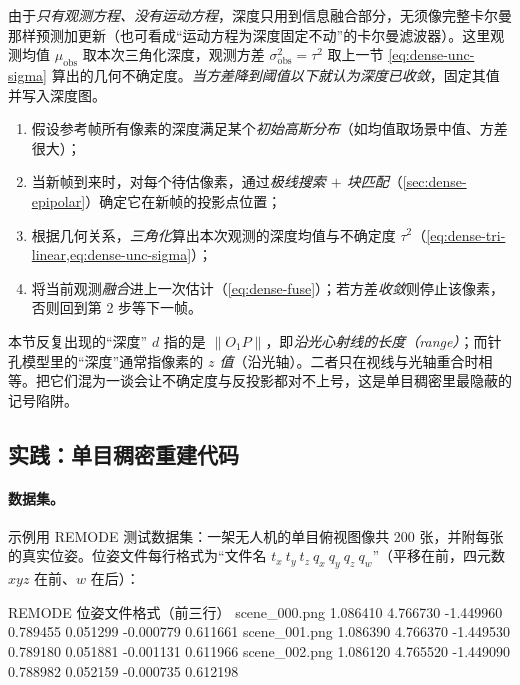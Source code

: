 由于\emph{只有观测方程、没有运动方程}，深度只用到信息融合部分，无须像完整卡尔曼那样预测加更新（也可看成“运动方程为深度固定不动”的卡尔曼滤波器）。这里观测均值 $\mu_{\mathrm{obs}}$ 取本次三角化深度，观测方差 $\sigma_{\mathrm{obs}}^2=\tau^2$ 取上一节 \cref{eq:dense-unc-sigma} 算出的几何不确定度。\emph{当方差降到阈值以下就认为深度已收敛}，固定其值并写入深度图。

\begin{algo}\label{alg:dense-gauss-filter}
\begin{enumerate}
  \item 假设参考帧所有像素的深度满足某个\emph{初始高斯分布}（如均值取场景中值、方差很大）；
  \item 当新帧到来时，对每个待估像素，通过\emph{极线搜索 $+$ 块匹配}（\cref{sec:dense-epipolar}）确定它在新帧的投影点位置；
  \item 根据几何关系，\emph{三角化}算出本次观测的深度均值与不确定度 $\tau^2$（\cref{eq:dense-tri-linear,eq:dense-unc-sigma}）；
  \item 将当前观测\emph{融合}进上一次估计（\cref{eq:dense-fuse}）；若方差\emph{收敛}则停止该像素，否则回到第 2 步等下一帧。
\end{enumerate}
\end{algo}

\begin{insight}[深度 $\neq$ 像素 $z$ 值]\label{ins:dense-depth-vs-z}
本节反复出现的“深度” $d$ 指的是 $\|O_1P\|$，即\emph{沿光心射线的长度（range）}；而针孔模型里的“深度”通常指像素的 \emph{$z$ 值}（沿光轴）。二者只在视线与光轴重合时相等。把它们混为一谈会让不确定度与反投影都对不上号，这是单目稠密里最隐蔽的记号陷阱。
\end{insight}

\subsection{实践：单目稠密重建代码}
\label{sec:dense-mono-code}

\paragraph{数据集。}
示例用 REMODE\cite{pizzoli2014remode} 测试数据集：一架无人机的单目俯视图像共 200 张，并附每张的真实位姿。位姿文件每行格式为“文件名 $t_x\ t_y\ t_z\ q_x\ q_y\ q_z\ q_w$”（平移在前，四元数 $xyz$ 在前、$w$ 在后）：

\begin{codebox}[text]{REMODE 位姿文件格式（前三行）}
scene_000.png 1.086410 4.766730 -1.449960 0.789455 0.051299 -0.000779 0.611661
scene_001.png 1.086390 4.766370 -1.449530 0.789180 0.051881 -0.001131 0.611966
scene_002.png 1.086120 4.765520 -1.449090 0.788982 0.052159 -0.000735 0.612198
\end{codebox}


